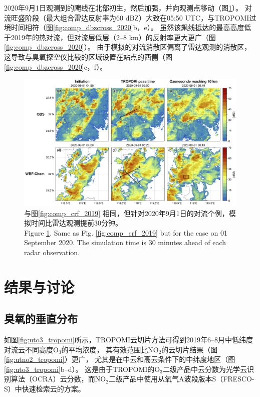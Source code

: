 2020年9月1日观测到的飑线在北部初生，然后加强，并向观测点移动（图\ref{fig:comp_crf_2020}）。
对流旺盛阶段（最大组合雷达反射率为60 dBZ）大致在05:50 UTC，与TROPOMI过境时间相符（图\ref{fig:comp_dbzcross_2020}b，e）。
虽然该飙线抵达的最高高度低于2019年的热对流，但对流层低层（2--8 km）的反射率更大更广（图\ref{fig:comp_dbzcross_2020}）。
由于模拟的对流消散区偏离了雷达观测的消散区，这导致与臭氧探空仪比较的区域设置在站点的西侧（图\ref{fig:comp_dbzcross_2020}c，f）。


\begin{figure}[H]
\centering
\includegraphics[width=\textwidth]{./figures/comp_crf_2020.png}
\caption{与图\ref{fig:comp_crf_2019} 相同，但针对2020年9月1日的对流个例，模拟时间比雷达观测提前30分钟。\\
Figure \ref{fig:comp_crf_2020}. Same as Fig. \ref{fig:comp_crf_2019} but for the case on 01 September 2020.
The simulation time is 30 minutes ahead of each radar observation.}
\label{fig:comp_crf_2020}
\end{figure}

\section{结果与讨论}

\subsection{臭氧的垂直分布} \label{sec:o3_profile}

如图\ref{fig:uto3_tropomi}所示，TROPOMI云切片方法可得到2019年6--8月中低纬度对流云不同高度O$_3$的平均浓度，
其有效范围比NO$_2$的云切片结果（图\ref{fig:utno2_tropomi}）更广，
尤其是在中云和高云条件下的中纬度地区（图\ref{fig:uto3_tropomi}b--d）。
这是由于TROPOMI的O$_3$二级产品中云分数为光学云识别算法（OCRA）云分数，而NO$_2$二级产品中使用从氧气A波段版本S（FRESCO-S）中快速检索云的方案。


